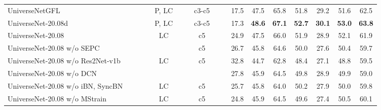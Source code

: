 \documentclass[10pt,twocolumn,letterpaper]{article}
\newcommand{\Univs}{UniverseNets\xspace}
\newcommand{\OurGFL}{UniverseNetGFL\xspace}
\newcommand{\OurAugustD}{UniverseNet-20.08d\xspace}
\newcommand{\OurAugust}{UniverseNet-20.08\xspace}
\newcommand{\TB}{\textbf}
\begin{document}
\begin{table*}[t]
\begin{center}
{\begin{tabular}{lcccccccccc@{\hspace{.9em}}cccccc}
	\OurGFL                                      & \cm  &        \cm         & \cm & P, LC &            & \cm  & c3-c5 &          &   \cm   & 17.5 &   47.5    &   65.8    &   51.8    &   29.2    &   51.6    &   62.5    \\
	\OurAugustD                                  & \cm  &        \cm         & \cm & P, LC &    \cm     & \cm  & c3-c5 &   \cm    &   \cm   & 17.3 & \TB{48.6} & \TB{67.1} & \TB{52.7} & \TB{30.1} & \TB{53.0} & \TB{63.8} \\
	\OurAugust                                   & \cm  &        \cm         & \cm &  LC   &    \cm     & \cm  &  c5   &   \cm    &   \cm   & 24.9 &   47.5    &   66.0    &   51.9    &   28.9    &   52.1    &   61.9    \\ \midrule
	\OurAugust w/o SEPC~\cite{SEPC_CVPR2020}                 & \cm  &        \cm         &     &       &            & \cm  &  c5   &   \cm    &   \cm   & 26.7 &   45.8    &   64.6    &   50.0    &   27.6    &   50.4    &   59.7    \\
	\OurAugust w/o Res2Net-v1b~\CITERRB                      & \cm  &        \cm         & \cm &  LC   &    \cm     &      &  c5   &   \cm    &   \cm   & 32.8 &   44.7    &   62.8    &   48.4    &   27.1    &   48.8    &   59.5    \\
	\OurAugust w/o DCN~\cite{DCN_ICCV2017}                   & \cm  &        \cm         & \cm &       &    \cm     & \cm  &       &   \cm    &   \cm   & 27.8 &   45.9    &   64.5    &   49.8    &   28.9    &   49.9    &   59.0    \\
	\OurAugust w/o iBN, SyncBN~\CITEiBNSBN                   & \cm  &        \cm         & \cm &  LC   &            & \cm  &  c5   &          &   \cm   & 25.7 &   45.8    &   64.0    &   50.2    &   27.9    &   50.0    &   59.8    \\
	\OurAugust w/o MStrain                                   & \cm  &        \cm         & \cm &  LC   &    \cm     & \cm  &  c5   &   \cm    &         & 24.8 &   45.9    &   64.5    &   49.6    &   27.4    &   50.5    &   60.1    \\ \bottomrule
\end{tabular}}
\end{center}
\vspace{-3.6mm}
\caption{
	Architectures of \Univs with a summary of ablation studies on COCO \texttt{minival}.
	See Sec.~\ref{sec:coco_ablation} for step-by-step improvements.
    All results are based on MMDetection~\cite{MMDetection} v2.
	The ``Head'' methods (ATSS and GFL) affect losses and training sample selection.
}
\end{table*}
\end{document}
